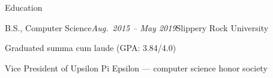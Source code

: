 \documentclass{resume} %
\begin{document}
\begin{rSection}{Education}

\begin{rSubsection}{B.S., Computer Science}{\em Aug.\ 2015 – May 2019}{Slippery Rock University}{}
\item Graduated summa cum laude (GPA: 3.84/4.0)
\item Vice President of Upsilon Pi Epsilon — computer science honor society
\end{rSubsection}

\end{rSection}




\end{document}
